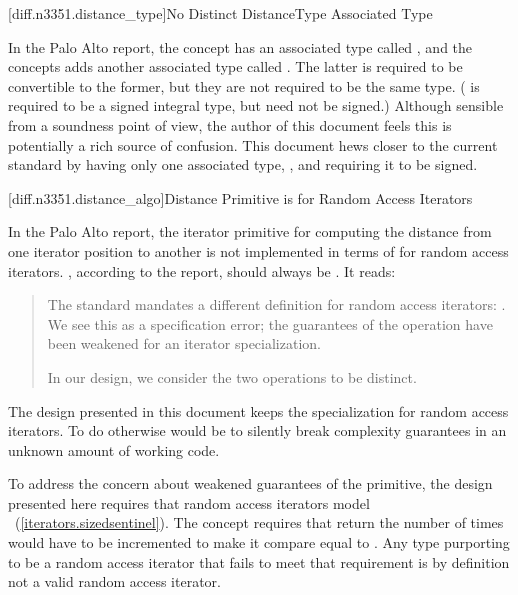 [diff.n3351.distance_type]{No Distinct DistanceType Associated Type}

\pnum
In the Palo Alto report, the  concept has an associated type called
, and the  concepts adds another associated type
called . The latter is required to be convertible to the former, but they are
not required to be the same type. ( is required to be a signed integral type,
but  need not be signed.) Although sensible from a soundness point of view,
the author of this document feels this is potentially a rich source of confusion. This document hews
closer to the current standard by having only one associated type, , and
requiring it to be signed.

[diff.n3351.distance_algo]{Distance Primitive is  for Random Access Iterators}

\pnum
In the Palo Alto report, the  iterator primitive for computing the distance from one
iterator position to another is not implemented in terms of  for random access
iterators. , according to the report, should always be . It reads:

\begin{quote}
The standard mandates a different definition for random access iterators:
. We see this as a specification error; the guarantees of the
 operation have been weakened for an iterator specialization.

In our design, we consider the two operations to be distinct.
\end{quote}

The design presented in this document keeps the specialization for random access iterators. To do
otherwise would be to silently break complexity guarantees in an unknown amount of working code.

To address the concern about weakened guarantees of the  primitive, the design
presented here requires that random access iterators model
~(\ref{iterators.sizedsentinel}). The 
concept requires that  return the number of times  would have to be
incremented to make it compare equal to . Any type purporting to be a random access
iterator that fails to meet that requirement is by definition not a valid random access iterator.

